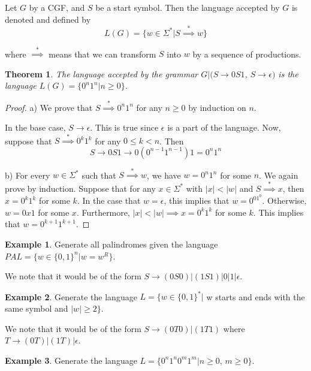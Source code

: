 \documentclass[11pt]{article}
\theoremstyle{plain} %
\newtheorem*{theorem}{Theorem}
\theoremstyle{definition}
\theoremstyle{example}
\newtheorem*{example}{Example}
\theoremstyle{remark}
\begin{document}
Let $G$ by a CGF, and $S$ be a start symbol. Then the language accepted by $G$ is denoted and defined by $$L(G) = \{w \in \Sigma^* | S\overset{*}{\implies} w\}$$

where $\overset{*}{\implies}$ means that we can transform $S$ into $w$ by a sequence of productions.


\begin{theorem}
The language accepted by the grammar $G |( S \rightarrow 0S1$, $S \rightarrow \epsilon)$ is the language $L(G) = \{0^n1^n | n \geq 0\}$. \end{theorem}

\begin{proof}
a) We prove that $S \overset{*}{\implies} 0^n1^n$ for any $n \geq 0$ by induction on $n$. 

In the base case, $S \rightarrow \epsilon$. This is true since $\epsilon$ is a part of the language. Now, suppose that $S \overset{*}{\implies} 0^k1^k$ for any $0 \leq k < n$. Then 
$$S \rightarrow 0S1 \rightarrow 0(0^{n-1}1^{n-1})1 = 0^n1^n$$

b) For every $w \in \Sigma^*$ such that $S \overset{*}{\implies} w$, we have $w = 0^n1^n$ for some $n$. We again prove by induction. Suppose that for any $x \in \Sigma^*$ with $|x| < |w|$ and $S \overset{*}{\implies} x$, then $x = 0^k1^k$ for some $k$. In the case that $w = \epsilon$, this implies that $w = 0^01^0$. Otherwise, $w = 0x1$ for some $x$. Furthermore, $|x| < |w| \implies x = 0^k1^k$ for some $k$. This implies that $w = 0^{k+1}1^{k+1}$.

\end{proof}

\begin{example}
Generate all palindromes given the language $PAL = \{w \in \{0,1\}^n|w = w^R\}$.
\end{example}

We note that it would be of the form
$S \rightarrow (0S0) | (1S1) | 0|1|\epsilon$.


\begin{example}
Generate the language $L = \{ w \in \{0,1\}^* |$ w starts and ends with the same symbol and $|w| \geq 2\}$.
\end{example}

We note that it would be of the form $S \rightarrow (0T0 )| (1T1)$ where $T \rightarrow (0T)|(1T)|\epsilon$.

\begin{example}
Generate the language $L = \{0^n1^n0^m1^m | n \geq 0$, $m \geq 0\}$.
\end{example}
\end{document}
